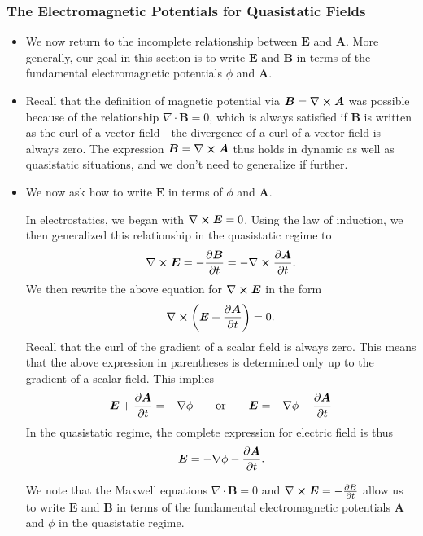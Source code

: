 \documentclass[11pt, a4paper]{article}
\renewcommand{\vec}[1]{\bm{#1}} %
\newcommand{\E}{\vec{E}} %
\newcommand{\B}{\vec{B}} %
\newcommand{\A}{\vec{A}} %
\renewcommand{\div}{\nabla \cdot}
\renewcommand{\curl}{\nabla \cross}
\renewcommand{\grad}{\nabla}
\begin{document}
\subsubsection{The Electromagnetic Potentials for Quasistatic Fields}
\begin{itemize}
	\item We now return to the incomplete relationship between $ \E $ and $ \A $. More generally, our goal in this section is to write $ \E $ and $ \B $ in terms of the fundamental electromagnetic potentials $ \phi $ and $ \A $.
	
    \item Recall that the definition of magnetic potential via $ \B = \curl \A $ was possible because of the relationship $ \div \B = 0 $, which is always satisfied if $ \B $ is written as the curl of a vector field---the divergence of a curl of a vector field is always zero. The expression $ \B = \curl \A $ thus holds in dynamic as well as quasistatic situations, and we don't need to generalize if further.

	\item We now ask how to write $ \E $ in terms of $ \phi $ and $ \A $. 

    In electrostatics, we began with $ \curl \E = 0 $. Using the law of induction, we then generalized this relationship in the quasistatic regime to
	\begin{equation*}
		\curl \E = - \pdv{\B}{t} = - \curl \pdv{\A}{t}.
	\end{equation*}
    We then rewrite the above equation for $ \curl \E $ in the form
	\begin{equation*}
		\curl \left(\E + \pdv{\A}{t}\right) = 0.
	\end{equation*}
	Recall that the curl of the gradient of a scalar field is always zero. This means that the above expression in parentheses is determined only up to the gradient of a scalar field. This implies
	\begin{equation*}
        \E + \pdv{\A}{t} = - \grad \phi \qquad \text{or} \qquad \E = - \grad \phi - \pdv{\A}{t}
	\end{equation*} 
	In the quasistatic regime, the complete expression for electric field is thus
	\begin{equation*}
		\E = - \grad \phi - \pdv{\A}{t}.
	\end{equation*}
	
    We note that the Maxwell equations $ \div \B = 0 $ and $ \curl \E = - \pdv{B}{t} $ allow us to write $ \E $ and $ \B $ in terms of the fundamental electromagnetic potentials $ \A $ and $ \phi $ in the quasistatic regime. 
	
\end{itemize}
\end{document}
